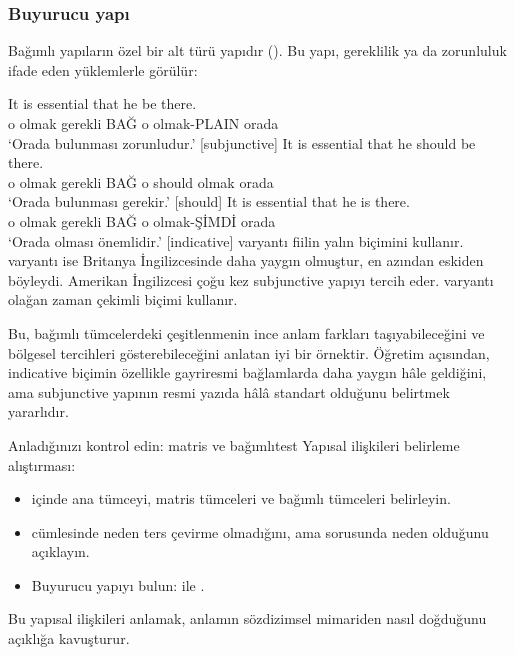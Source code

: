 \subsubsection*{Buyurucu yapı}

Bağımlı yapıların özel bir alt türü  yapıdır (). Bu yapı, gereklilik ya da zorunluluk ifade eden yüklemlerle görülür:

\ea \label{ex:mandative-tr}
    \ea \gll It is essential {\ob}that he be there{\cb}.\\
        o olmak gerekli BAĞ o olmak-PLAIN orada\\
    \glt `Orada bulunması zorunludur.' [subjunctive]
    \ex \gll It is essential {\ob}that he should be there{\cb}.\\
        o olmak gerekli BAĞ o should olmak orada\\
    \glt `Orada bulunması gerekir.' [should]
    \ex \gll It is essential {\ob}that he is there{\cb}.\\
        o olmak gerekli BAĞ o olmak-ŞİMDİ orada\\
    \glt `Orada olması önemlidir.' [indicative]
    \z
\z
{} varyantı fiilin yalın biçimini kullanır.  varyantı ise Britanya İngilizcesinde daha yaygın olmuştur, en azından eskiden böyleydi. Amerikan İngilizcesi çoğu kez subjunctive yapıyı tercih eder.  varyantı olağan zaman çekimli biçimi kullanır.

Bu, bağımlı tümcelerdeki çeşitlenmenin ince anlam farkları taşıyabileceğini ve bölgesel tercihleri gösterebileceğini anlatan iyi bir örnektir. Öğretim açısından, indicative biçimin özellikle gayriresmi bağlamlarda daha yaygın hâle geldiğini, ama subjunctive yapının resmi yazıda hâlâ standart olduğunu belirtmek yararlıdır.

\begin{tblsframedsymbol}{Anladığınızı kontrol edin: matris ve bağımlı}{test}
Yapısal ilişkileri belirleme alıştırması:
\begin{itemize}[noitemsep, leftmargin=*]
    \item {} içinde ana tümceyi, matris tümceleri ve bağımlı tümceleri belirleyin.
    \item {} cümlesinde neden ters çevirme olmadığını, ama  sorusunda neden olduğunu açıklayın.
    \item Buyurucu yapıyı bulun:  ile .
\end{itemize}
Bu yapısal ilişkileri anlamak, anlamın sözdizimsel mimariden nasıl doğduğunu açıklığa kavuşturur.
\end{tblsframedsymbol}

